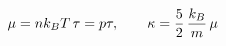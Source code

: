 \documentclass[preview]{standalone}
\begin{document}
\begin{align*}
\special{dvisvgm:raw <g id='unique000'>}\mu=nk_BT\,\tau=p\tau,\qquad \kappa=\frac52\,\frac{k_B}{m}\,\mu\special{dvisvgm:raw </g>}
\end{align*}
\end{document}
